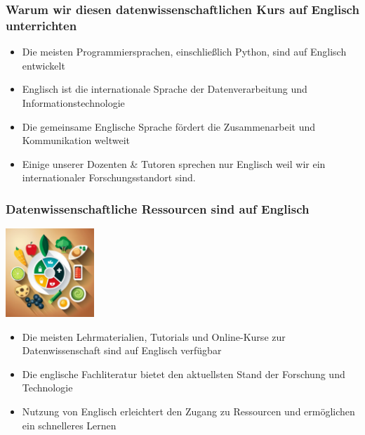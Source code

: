 \documentclass{beamer}
\begin{document}
    \begin{frame}
        \frametitle{Warum wir diesen datenwissenschaftlichen Kurs auf Englisch unterrichten}
        \begin{itemize}
            \item Die meisten Programmiersprachen, einschließlich Python, sind auf Englisch entwickelt
            \item Englisch ist die internationale Sprache der Datenverarbeitung und Informationstechnologie
            \item Die gemeinsame Englische Sprache fördert die Zusammenarbeit und Kommunikation weltweit
            \item Einige unserer Dozenten \& Tutoren sprechen nur Englisch weil wir ein internationaler Forschungsstandort sind.
        \end{itemize}
    \end{frame}
        
    \begin{frame}
        \frametitle{Datenwissenschaftliche Ressourcen sind auf Englisch}
        \begin{center}
            \includegraphics[width=0.25\textwidth]{figures/data-science-resources-english}
        \end{center}
        \begin{itemize}
            \item Die meisten Lehrmaterialien, Tutorials und Online-Kurse zur Datenwissenschaft sind auf Englisch verfügbar
            \item Die englische Fachliteratur bietet den aktuellsten Stand der Forschung und Technologie
            \item Nutzung von Englisch erleichtert den Zugang zu Ressourcen und ermöglichen ein schnelleres Lernen
        \end{itemize}
    \end{frame}
        
\end{document}
